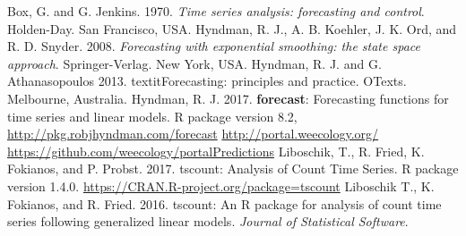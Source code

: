 \documentclass{article}
\begin{document}
\begin{thebibliography}{9}
Box, G. and G. Jenkins. 1970. \textit{Time series analysis: forecasting and control}. Holden-Day. San Francisco, USA. 
Hyndman, R. J., A. B. Koehler, J. K. Ord, and R. D. Snyder. 2008. \textit{Forecasting with exponential smoothing: the state space approach}. Springer-Verlag. New York, USA.
  Hyndman, R. J. and G. Athanasopoulos 2013. textit{Forecasting: principles and practice}. OTexts. Melbourne, Australia.
  Hyndman, R. J. 2017. \textbf{forecast}: Forecasting functions for time series and linear models. R package version 8.2, \url{http://pkg.robjhyndman.com/forecast}
  \url{http://portal.weecology.org/}
  \url{https://github.com/weecology/portalPredictions}
Liboschik, T., R. Fried, K. Fokianos, and P. Probst. 2017. tscount: Analysis of Count Time Series. R package
  version 1.4.0. \url{https://CRAN.R-project.org/package=tscount}
Liboschik T., K. Fokianos, and R. Fried. 2016. tscount: An R package for analysis of count time series following generalized linear models.
\textit{Journal of Statistical Software}.
\end{thebibliography}
\end{document}
